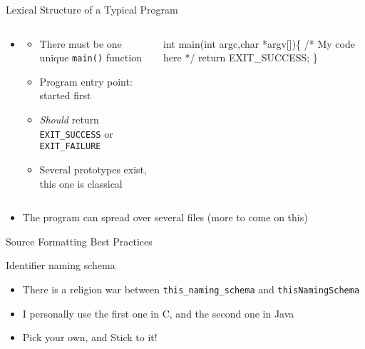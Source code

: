 \begin{Coupe}
\begin{frame}{Lexical Structure of a Typical Program}
\begin{itemize}
\begin{columns}
\begin{column}{.39\linewidth}
\begin{boitecode}{}
      \end{boitecode}
    \end{column}
  \end{columns}

\item {}
  \vspace{-.4\baselineskip}
  \begin{columns}
    \begin{column}{.6\linewidth}
      \begin{itemize}\vspace{-.8\baselineskip}
      \item There must be one unique \texttt{main()} function
      \item Program entry point: started first
      \item \textit{Should} return {\scriptsize\texttt{EXIT\_SUCCESS}} or
        {\scriptsize\texttt{EXIT\_FAILURE}}
      \item Several prototypes exist, this one is classical
      \end{itemize}
    \end{column}
    \begin{column}{.39\linewidth}
      \medskip
      \begin{boitecode}{}
int main(int argc,char *argv[])\{
  /* My code here */
  return EXIT_SUCCESS;
\}

      \end{boitecode}
    \end{column}
  \end{columns}\item The program can spread over several files (more to come on this)
\end{itemize}
\end{frame}
\begin{frame}[fragile]{Source Formatting Best Practices}
  \begin{block}{Identifier naming schema}
    \begin{itemize}
    \item There is a religion war between \texttt{\small this\_naming\_schema} and
      \texttt{\small thisNamingSchema}
    \item I personally  use the first one in C, and the second one in Java
    \item Pick your own, and {\sc Stick to it!}
    \end{itemize}
  \end{block}      \vspace{-.7\baselineskip}


\end{frame}
\end{Coupe}
